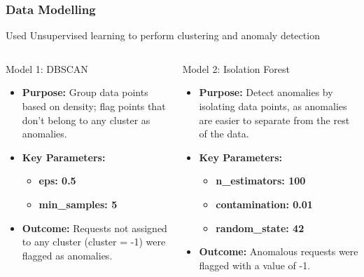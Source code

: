 \documentclass[10pt, a4paper]{beamer}
\begin{document}
	\begin{frame}
		\frametitle{Data Modelling}
		Used Unsupervised learning to perform clustering and anomaly detection
		
		\begin{columns}
			\begin{block}{Model 1: DBSCAN}
				\begin{itemize}
					\item \textbf{Purpose:} Group data points based on density; flag points that don’t belong to any cluster as anomalies.
				\end{itemize}
				\begin{itemize}
					\item \textbf{Key Parameters:}
					\begin{itemize}
						\item \textbf{eps: 0.5}
						\item \textbf{min\_samples: 5}
					\end{itemize}
				\end{itemize}
				\begin{itemize}
					\item \textbf{Outcome:} Requests not assigned to any cluster (cluster = -1) were flagged as anomalies.
				\end{itemize}
			\end{block}
			
			\begin{block}{Model 2: Isolation Forest}
				\begin{itemize}
					\item \textbf{Purpose:} Detect anomalies by isolating data points, as anomalies are easier to separate from the rest of the data.
				\end{itemize}
				\begin{itemize}
					\item \textbf{Key Parameters:}
					\begin{itemize}
						\item \textbf{n\_estimators: 100} 
						\item \textbf{contamination: 0.01}
						\item \textbf{random\_state: 42}
					\end{itemize}
				\end{itemize}
				\begin{itemize}
					\item \textbf{Outcome:} Anomalous requests were flagged with a value of -1.
				\end{itemize}
			\end{block}
		\end{columns}
	\end{frame}
	
\end{document}
